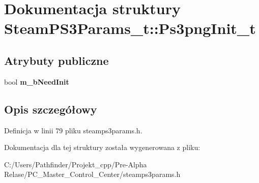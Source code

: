 \hypertarget{struct_steam_p_s3_params__t_1_1_ps3png_init__t}{}\section{Dokumentacja struktury Steam\+P\+S3\+Params\+\_\+t\+:\+:Ps3png\+Init\+\_\+t}
\label{struct_steam_p_s3_params__t_1_1_ps3png_init__t}
\subsection*{Atrybuty publiczne}
\begin{DoxyCompactItemize}
\item 
\mbox{\label{struct_steam_p_s3_params__t_1_1_ps3png_init__t_aa0d6e40579ccf40bd7425e329b1be97e}} 
bool {\bfseries m\+\_\+b\+Need\+Init}
\end{DoxyCompactItemize}


\subsection{Opis szczegółowy}


Definicja w linii 79 pliku steamps3params.\+h.



Dokumentacja dla tej struktury została wygenerowana z pliku\+:\begin{DoxyCompactItemize}
\item 
C\+:/\+Users/\+Pathfinder/\+Projekt\+\_\+cpp/\+Pre-\/\+Alpha Relase/\+P\+C\+\_\+\+Master\+\_\+\+Control\+\_\+\+Center/steamps3params.\+h\end{DoxyCompactItemize}
